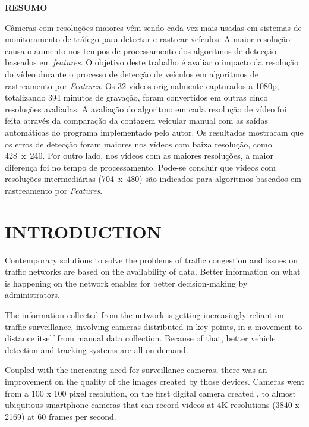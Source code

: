 \documentclass[article,12pt,a4paper,oneside,hidelinks]{memoir}
\begin{document}
\begin{footnotesize}
	\uppercase{\footnotesize{\textbf{resumo}}}
	\setlength{\parskip}{0pt}\par
	\begin{SingleSpace}
		\footnotesize
		Câmeras com resoluções maiores vêm sendo cada vez mais usadas em sistemas de monitoramento de tráfego para detectar e rastrear veículos. A maior resolução causa o aumento nos tempos de processamento dos algoritmos de detecção baseados em \textit{features}. O objetivo deste trabalho é avaliar o impacto da resolução do vídeo durante o processo de detecção de veículos em algoritmos de rastreamento por \textit{Features}. Os 32 vídeos originalmente capturados a 1080p, totalizando 394 minutos de gravação, foram convertidos em outras cinco resoluções avaliadas. A avaliação do algoritmo em cada resolução de vídeo foi feita através da comparação da contagem veicular manual com as saídas automáticas do programa implementado pelo autor. Os resultados mostraram que os erros de detecção foram maiores nos vídeos com baixa resolução, como 428~x~240. Por outro lado, nos vídeos com as maiores resoluções, a maior diferença foi no tempo de processamento. Pode-se concluir que vídeos com resoluções intermediárias (704~x~480) são indicados para algoritmos baseados em rastreamento por \textit{Features}.
	\end{SingleSpace}
\end{footnotesize}


\pagestyle{empty}

\section{INTRODUCTION}
\label{secIntroduction}
Contemporary solutions to solve the problems of traffic congestion and issues on traffic networks are based on the availability of data. Better information on what is happening on the network enables for better decision-making by administrators.

The information collected from the network is getting increasingly reliant on traffic surveillance, involving cameras distributed in key points, in a movement to distance itself from manual data collection. Because of that, better vehicle detection and tracking systems are all on demand.

Coupled with the increasing need for surveillance cameras, there was an improvement on the quality of the images created by those devices. Cameras went from a 100 x 100 pixel resolution, on the first digital camera created \citep{Kodak2019}, to almost ubiquitous smartphone cameras that can record videos at 4K resolutions (3840 x 2169) at 60 frames per second.
\end{document}
